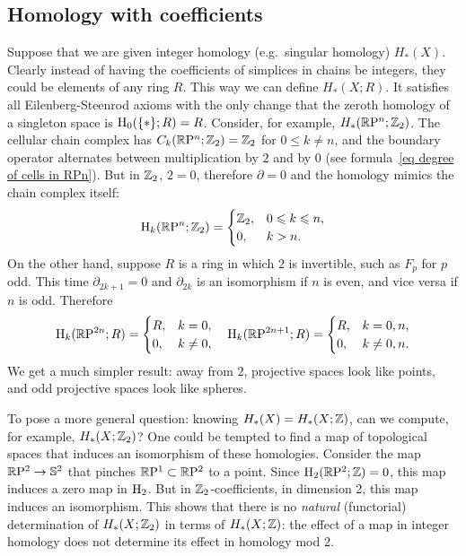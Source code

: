 




\subsection{Homology with coefficients}

Suppose that we are given integer homology (e.g.~singular homology) $H_\ast(X)$. Clearly instead of having the coefficients of simplices in chains be integers, they could be elements of any ring $R$. This way we can define $H_\ast(X;R)$. It satisfies all Eilenberg-Steenrod axioms with the only change that the zeroth homology of a singleton space is $\mathrm{H}_0(\{\ast\};R)=R$. Consider, for example, $H_\ast(\mathbb{R}\mathrm{P}^n;\mathbb{Z}_2)$. The cellular chain complex has $C_k(\mathbb{R}\mathrm{P}^n;\mathbb{Z}_2)=\mathbb{Z}_2$ for $0\leq k\neq n$, and the boundary operator alternates between multiplication by $2$ and by $0$ (see formula~\ref{eq degree of cells in RPn}). But in $\mathbb{Z}_2$, $2=0$, therefore $\partial=0$ and the homology mimics the chain complex itself:
\[\mathrm{H}_k(\mathbb{R}\mathrm{P}^n;\mathbb{Z}_2)=\begin{cases}
    \mathbb{Z}_2,& 0\leqslant k\leqslant n,\\
    0, & k>n.
\end{cases}\]
On the other hand, suppose $R$ is a ring in which $2$ is invertible, such as $F_p$ for $p$ odd. This time $\partial_{2k+1}=0$ and $\partial_{2k}$ is an isomorphism if $n$ is even, and vice versa if $n$ is odd. Therefore 
\[\mathrm{H}_k(\mathbb{R}\mathrm{P}^{2n};R)=\begin{cases}
    R,&k=0,\\
    0,&k\neq 0,
\end{cases}\quad
\mathrm{H}_k(\mathbb{R}\mathrm{P}^{2n+1};R)=\begin{cases}
    R,&k=0,n,\\
    0,&k\neq 0,n.
\end{cases}
\]
We get a much simpler result: away from $2$, projective spaces look like points, and odd projective spaces look like spheres.

To pose a more general question: knowing $H_\ast(X)=H_\ast(X;\mathbb{Z})$, can we compute, for example, $H_\ast(X;\mathbb{Z}_2)$? One could be tempted to find a map of topological spaces that induces an isomorphism of these homologies. Consider the map $\mathbb{R}\mathrm{P}^2\to \mathbb{S}^2$ that pinches $\mathbb{R}\mathrm{P}^1\subset \mathbb{R}\mathrm{P}^2$ to a point. Since $\mathrm{H}_2(\mathbb{R}\mathrm{P}^2;\mathbb{Z})=0$, this map induces a zero map in $\mathrm{H}_2$. But in $\mathbb{Z}_2$-coefficients, in dimension 2, this map induces an isomorphism. This shows that there is no \emph{natural} (functorial) determination of $H_\ast(X;\mathbb{Z}_2)$ in terms of $H_\ast(X;\mathbb{Z})$: the effect of a map in integer homology does not determine its effect in homology mod $2$. 

